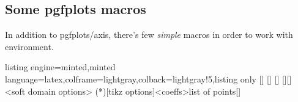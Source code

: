 \documentclass[11pt,a4paper]{ltxdoc}
\begin{document}
\pagebreak

\subsection{Some pgfplots macros}

In addition to pgfplots/axis, there's few \textit{simple} macros in order to work with  environment.

\begin{tcblisting}{listing engine=minted,minted language=latex,colframe=lightgray,colback=lightgray!5,listing only}
[\myt]
[\myxcoord]
[\myycoord]
[\myxcoord][\myycoord]
<soft domain options>
\addplotspline(*)[tikz options]<coeffs>{list of points}[\myspline]
\end{tcblisting}
\end{document}
